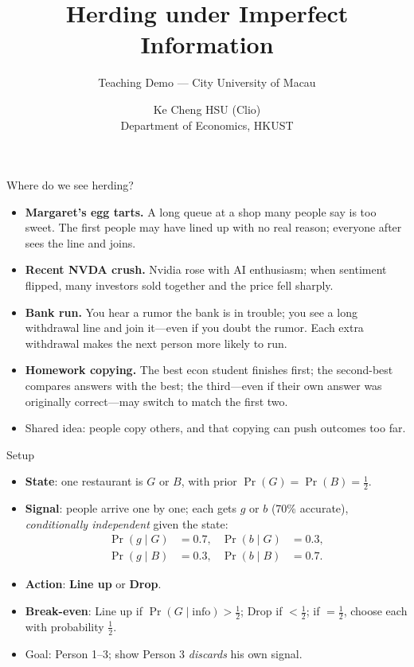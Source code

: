\documentclass[aspectratio=169,11pt]{beamer}
\title{Herding under Imperfect Information}
\subtitle{Teaching Demo --- City University of Macau}
\author{Ke Cheng HSU (Clio)\\Department of Economics, HKUST}
\date{}
\begin{document}
\begin{frame}[plain]
\vspace*{-0.6cm}
\titlepage
\end{frame}

\begin{frame}{Where do we see herding?}
\begin{itemize}
  \item \textbf{Margaret's egg tarts.} A long queue at a shop many people say is too sweet. The first people may have lined up with no real reason; everyone after sees the line and joins.
  \item \textbf{Recent NVDA crush.} Nvidia rose with AI enthusiasm; when sentiment flipped, many investors sold together and the price fell sharply.
  \item \textbf{Bank run.} You hear a rumor the bank is in trouble; you see a long withdrawal line and join it---even if you doubt the rumor. Each extra withdrawal makes the next person more likely to run.
  \item \textbf{Homework copying.} The best econ student finishes first; the second-best compares answers with the best; the third---even if their own answer was originally correct---may switch to match the first two.
  \item Shared idea: people copy others, and that copying can push outcomes too far.
\end{itemize}
\end{frame}

\begin{frame}{Setup}
\begin{itemize}
  \item \textbf{State}: one restaurant is $G$ or $B$, with prior $\Pr(G)=\Pr(B)=\tfrac12$.
  \item \textbf{Signal}: people arrive one by one; each gets $g$ or $b$ (70\% accurate), \textit{conditionally independent} given the state:
  \[
  \begin{aligned}
  \Pr(g\mid G)&=0.7,&
  \Pr(b\mid G)&=0.3,\\
  \Pr(g\mid B)&=0.3,&
  \Pr(b\mid B)&=0.7.
  \end{aligned}
  \]
  \item \textbf{Action}: \textbf{Line up} or \textbf{Drop}.
  \item \textbf{Break-even}: Line up if $\Pr(G\mid \text{info}) > \tfrac12$; Drop if $< \tfrac12$; if $= \tfrac12$, choose each with probability $\tfrac12$.
  \item Goal: Person 1--3; show Person 3 \textit{discards} his own signal.
\end{itemize}
\end{frame}
\end{document}
